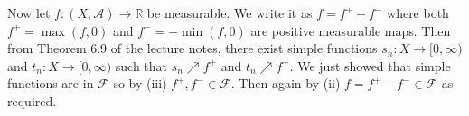 \documentclass[12pt]{amsart} %
\def\R{\mathbb{R}}
\def\A{\mathcal{A}}
\def\F{\mathcal{F}}
\begin{document}
 Now let $f: \left( X, \A \right) \to \R$ be measurable. We write it as $f = f^+ - f^-$ where both $f^+ = \max(f,0)$ and  $f^- = -\min(f,0)$ are positive measurable maps. Then from Theorem 6.9 of the lecture notes, there exist simple functions $s_n: X \to [0, \infty)$ and $t_n: X \to [0, \infty)$ such that $s_n \nearrow f^+$ and  $t_n \nearrow f^-$. We just showed that simple functions are in  $\F$ so by (iii) $f^+, f^- \in \F$. Then again by (ii)  $f = f^+ - f^- \in \F$ as required. 






 

 











  




















\vfill 
 
\end{document}
